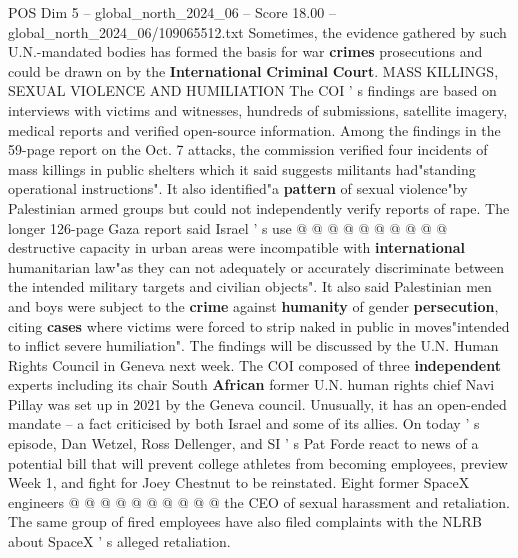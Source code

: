 \begin{textsample}{POS Dim 5 – global\_north\_2024\_06 – Score 18.00 – global\_north\_2024\_06/109065512.txt}
Sometimes, the evidence gathered by such U.N.-mandated bodies has formed the basis for war \textbf{crimes} prosecutions and could be drawn on by the \textbf{International} \textbf{Criminal} \textbf{Court}.
MASS KILLINGS, SEXUAL VIOLENCE AND HUMILIATION The COI ' s findings are based on interviews with victims and witnesses, hundreds of submissions, satellite imagery, medical reports and verified open-source information.
Among the findings in the 59-page report on the Oct. 7 attacks, the commission verified four incidents of mass killings in public shelters which it said suggests militants had"standing operational instructions".
It also identified"a \textbf{pattern} of sexual violence"by Palestinian armed groups but could not independently verify reports of rape.
The longer 126-page Gaza report said Israel ' s use @ @ @ @ @ @ @ @ @ @ destructive capacity in urban areas were incompatible with \textbf{international} humanitarian law"as they can not adequately or accurately discriminate between the intended military targets and civilian objects".
It also said Palestinian men and boys were subject to the \textbf{crime} against \textbf{humanity} of gender \textbf{persecution}, citing \textbf{cases} where victims were forced to strip naked in public in moves"intended to inflict severe humiliation".
The findings will be discussed by the U.N.
Human Rights Council in Geneva next week.
The COI composed of three \textbf{independent} experts including its chair South \textbf{African} former U.N. human rights chief Navi Pillay was set up in 2021 by the Geneva council.
Unusually, it has an open-ended mandate -- a fact criticised by both Israel and some of its allies.
On today ' s episode, Dan Wetzel, Ross Dellenger, and SI ' s Pat Forde react to news of a potential bill that will prevent college athletes from becoming employees, preview Week 1, and fight for Joey Chestnut to be reinstated.
Eight former SpaceX engineers @ @ @ @ @ @ @ @ @ @ the CEO of sexual harassment and retaliation.
The same group of fired employees have also filed complaints with the NLRB about SpaceX ' s alleged retaliation.

\end{textsample}
